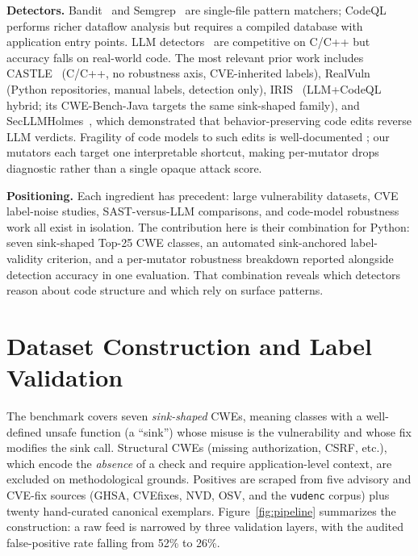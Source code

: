\documentclass[conference]{IEEEtran}
\begin{document}
\textbf{Detectors.} Bandit~\cite{bandit} and Semgrep~\cite{semgrep} are
single-file pattern matchers; CodeQL~\cite{codeql} performs richer
dataflow analysis but requires a compiled database with application entry
points. LLM detectors~\cite{khare_llm,steenhoek} are competitive on C/C++
but accuracy falls on real-world code. The most relevant prior work
includes CASTLE~\cite{castle} (C/C++, no robustness axis, CVE-inherited
labels), RealVuln~\cite{realvuln} (Python repositories, manual labels,
detection only), IRIS~\cite{iris} (LLM+CodeQL hybrid; its CWE-Bench-Java
targets the same sink-shaped family), and SecLLMHolmes~\cite{secllmholmes},
which demonstrated that behavior-preserving code edits reverse LLM
verdicts. Fragility of code models to such edits is well-documented
\cite{yefet,bielik,henkel}; our mutators each target one interpretable
shortcut, making per-mutator drops diagnostic rather than a single opaque
attack score.

\textbf{Positioning.} Each ingredient has precedent: large vulnerability
datasets, CVE label-noise studies, SAST-versus-LLM comparisons, and
code-model robustness work all exist in isolation. The contribution here
is their combination for Python: seven sink-shaped Top-25 CWE classes, an
automated sink-anchored label-validity criterion, and a per-mutator
robustness breakdown reported alongside detection accuracy in one
evaluation. That combination reveals which detectors reason about code
structure and which rely on surface patterns.

\section{Dataset Construction and Label Validation}
\label{sec:dataset}

The benchmark covers seven \emph{sink-shaped} CWEs, meaning classes
with a well-defined unsafe function (a ``sink'') whose misuse is the
vulnerability and whose fix modifies the sink call. Structural CWEs
(missing authorization, CSRF, etc.), which encode the \emph{absence} of
a check and require application-level context, are excluded on
methodological grounds. Positives are scraped from five advisory and
CVE-fix sources (GHSA, CVEfixes, NVD, OSV, and the \texttt{vudenc}
corpus) plus twenty hand-curated canonical exemplars.
Figure~\ref{fig:pipeline} summarizes the construction: a raw feed is
narrowed by three validation layers, with the audited false-positive
rate falling from 52\% to 26\%.
\end{document}
